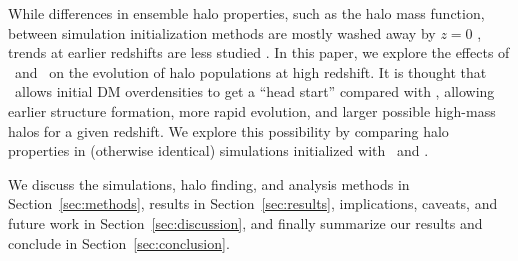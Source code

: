 
While differences in ensemble halo properties, such as the halo mass function, between simulation initialization methods are mostly washed away by $z=0$ \citep{1998MNRAS.299.1097S}, trends at earlier redshifts are less studied \citep{2007ApJ...671.1160L}.  In this paper, we explore the effects of \za\ and \lpt\ on the evolution of halo populations at high redshift.  It is thought that \lpt\ allows initial DM overdensities to get a ``head start'' compared with \za, allowing earlier structure formation, more rapid evolution, and larger possible high-mass halos for a given redshift.  We explore this possibility by comparing halo properties in (otherwise identical) simulations initialized with \za\ and \lpt.

We discuss the simulations, halo finding, and analysis methods in Section~\ref{sec:methods}, results in Section~\ref{sec:results}, implications, caveats, and future work in Section~\ref{sec:discussion}, and finally summarize our results and conclude in Section~\ref{sec:conclusion}.

